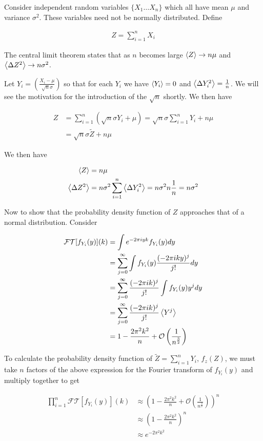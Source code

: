 \documentclass[12pt]{article}
\begin{document}
Consider independent random variables $\{X_1 \ldots X_n\}$ which all have mean $\mu$ and variance $\sigma^2$. These variables need not be normally distributed. Define

\begin{align}
Z = \sum_{i=1}^n X_i
\end{align}

The central limit theorem states that as $n$ becomes large $\Braket{Z} \rightarrow n\mu$ and $ \Braket{\Delta Z^2} \rightarrow n\sigma^2$. 

Let $Y_i = \left(\frac{X_i - \mu}{\sqrt{n}\sigma}\right)$ so that for each $Y_i$ we have $\Braket{Y_i} = 0$ and $\Braket{\Delta Y_i^2} = \frac{1}{n}$. We will see the motivation for the introduction of the $\sqrt{n}$ shortly. We then have

\begin{align}
Z &= \sum_{i=1}^n (\sqrt{n}\sigma Y_i + \mu) = \sqrt{n}\sigma\sum_{i=1}^n Y_i + n \mu\\
&= \sqrt{n}\sigma \tilde{Z} + n \mu
\end{align}

We then have

\begin{align}
\Braket{Z} &= n\mu\\
\Braket{\Delta Z^2} &= n\sigma^2 \sum_{i=1}^n \Braket{\Delta Y_i^2} = n\sigma^2 n\frac{1}{n} = n\sigma^2
\end{align}

Now to show that the probability density function of $Z$ approaches that of a normal distribution. Consider

\begin{align}
\mathcal{FT}[f_{Y_i}(y)](k) &= \int e^{-2\pi i yk}f_{Y_i}(y) dy\\
&= \sum_{j=0}^{\infty} \int f_{Y_i}(y) \frac{(-2\pi i ky)^j}{j!} dy\\
&= \sum_{j=0}^{\infty} \frac{(-2 \pi i k)^j}{j!}\int f_{Y_i}(y) y^j dy\\
&= \sum_{j=0}^{\infty} \frac{(-2 \pi i k)^j}{j!} \Braket{Y^j}\\
&= 1 - \frac{2 \pi^2 k^2}{n} + \mathcal{O}\left(\frac{1}{n^{\frac{3}{2}}}\right)
\end{align}

To calculate the probability density function of $\tilde{Z} = \sum_{i=1}^n Y_i$, $f_z(Z)$, we must take $n$ factors of the above expression for the Fourier transform of $f_{Y_i}(y)$ and multiply together to get

\begin{align}
\prod_{i=1}^n \mathcal{FT}[f_{Y_i}(y)](k)&\approx \left( 1 - \frac{2 \pi^2 k^2}{n} + \mathcal{O}\left(\frac{1}{n^{\frac{3}{2}}}\right) \right)^n\\
&\approx  \left( 1 - \frac{2 \pi^2 k^2}{n} \right)^n\\
&\approx e^{-2 \pi^2 k^2}
\end{align}
\end{document}
